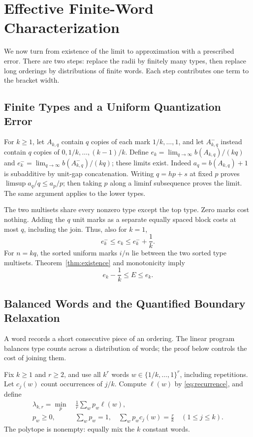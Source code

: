 \documentclass[11pt,letterpaper]{article}
\theoremstyle{definition}\newtheorem{definition}[theorem]{Definition}
\theoremstyle{remark}\newtheorem{remark}[theorem]{Remark}
\begin{document}
\section{Effective Finite-Word Characterization}\label{sec:lp}

We now turn from existence of the limit to approximation with a prescribed
error. There are two steps: replace the radii by finitely many types, then
replace long orderings by distributions of finite words. Each step contributes
one term to the bracket width.

\subsection{Finite Types and a Uniform Quantization Error}
For $k\ge1$, let $A_{k,q}$ contain $q$ copies of each mark
$1/k,\ldots,1$, and let $A^-_{k,q}$ instead contain $q$ copies of
$0,1/k,\ldots,(k-1)/k$. Define
$e_k=\lim_{q\to\infty}b(A_{k,q})/(kq)$ and
$e^-_k=\lim_{q\to\infty}b(A^-_{k,q})/(kq)$; these limits exist.
Indeed $a_q=b(A_{k,q})+1$ is subadditive by unit-gap concatenation.
Writing $q=hp+s$ at fixed $p$ proves
$\limsup a_q/q\le a_p/p$; then taking $p$ along a liminf subsequence
proves the limit. The same argument applies to the lower types.

The two multisets share every nonzero type except the top type. Zero marks
cost nothing. Adding the $q$ unit marks as a separate equally spaced
block costs at most $q$, including the join. Thus, also for $k=1$,
\[
 e^-_k\le e_k\le e^-_k+\frac1k.
\]
For $n=kq$, the sorted uniform marks $i/n$ lie between the two sorted
type multisets. Theorem~\ref{thm:existence} and monotonicity imply
\begin{equation}\label{eq:types}
 e_k-\frac1k\le E\le e_k.
\end{equation}

\subsection{Balanced Words and the Quantified Boundary Relaxation}
A word records a short consecutive piece of an ordering. The linear program
balances type counts across a distribution of words; the proof below controls
the cost of joining them.

Fix $k\ge1$ and $r\ge2$, and use all $k^r$ words
$w\in\{1/k,\ldots,1\}^r$, including repetitions. Let $c_j(w)$ count
occurrences of $j/k$. Compute $\ell(w)$ by \eqref{eq:recurrence}, and define
\begin{equation}\label{eq:lp}
\begin{split}
 \lambda_{k,r}=\min_p\ &\frac1r\sum_w p_w\ell(w),\\
 p_w\ge0,\quad &\sum_w p_w=1,\quad
 \sum_w p_wc_j(w)=\frac rk\quad(1\le j\le k).
\end{split}
\end{equation}
The polytope is nonempty: equally mix the $k$ constant words.
\end{document}
